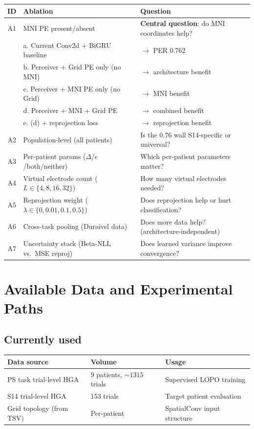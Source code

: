 \documentclass[11pt,letterpaper]{article}
\begin{document}
\begin{table}[h]\centering\small
\begin{tabular}{@{}clp{7.5cm}@{}}
\toprule
\textbf{ID} & \textbf{Ablation} & \textbf{Question} \\
\midrule
A1 & MNI PE present/absent & \textbf{Central question}: do MNI coordinates help? \\
 & \quad a. Current Conv2d + BiGRU baseline & $\to$ PER 0.762 \\
 & \quad b. Perceiver + Grid PE only (no MNI) & $\to$ architecture benefit \\
 & \quad c. Perceiver + MNI PE only (no Grid) & $\to$ MNI benefit \\
 & \quad d. Perceiver + MNI + Grid PE & $\to$ combined benefit \\
 & \quad e. (d) + reprojection loss & $\to$ reprojection benefit \\
\midrule
A2 & Population-level (all patients) & Is the 0.76 wall S14-specific or universal? \\
A3 & Per-patient params ($\Delta$/$e$/both/neither) & Which per-patient parameters matter? \\
A4 & Virtual electrode count ($L \in \{4, 8, 16, 32\}$) & How many virtual electrodes needed? \\
A5 & Reprojection weight ($\lambda \in \{0, 0.01, 0.1, 0.5\}$) & Does reprojection help or hurt classification? \\
A6 & Cross-task pooling (Duraivel data) & Does more data help? (architecture-independent) \\
A7 & Uncertainty stack (Beta-NLL vs.\ MSE reproj) & Does learned variance improve convergence? \\
\bottomrule
\end{tabular}
\end{table}


\section{Available Data and Experimental Paths}

\subsection{Currently used}

\begin{table}[h]\centering\small
\begin{tabular}{@{}lll@{}}
\toprule
\textbf{Data source} & \textbf{Volume} & \textbf{Usage} \\
\midrule
PS task trial-level HGA & 9 patients, ${\sim}1315$ trials & Supervised LOPO training \\
S14 trial-level HGA & 153 trials & Target patient evaluation \\
Grid topology (from TSV) & Per-patient & SpatialConv input structure \\
\bottomrule
\end{tabular}
\end{table}
\end{document}
